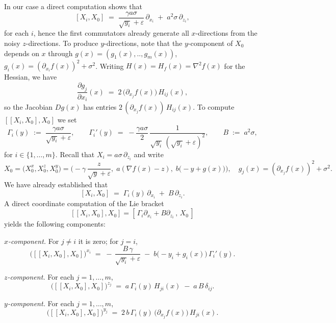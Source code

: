 \documentclass[11pt, a4paper,leqno]{amsart}
\theoremstyle{definition}
\numberwithin{equation}{section}
\begin{document}
 In our case a direct computation shows that
\[
[X_i,X_0] \;=\; \frac{\gamma a\sigma}{\sqrt{y_i}+\varepsilon}\,\partial_{x_i}
\;+\; a^2\sigma\,\partial_{z_i},
\]
for each $i$, hence the first commutators already generate all $x$-directions from the noisy $z$-directions.
To produce $y$-directions, note that the $y$-component of $X_0$ depends on $x$ through $g(x)=(g_1(x),..,g_m(x))$, $g_i(x)=(\partial_{x_i}f(x))^2+\sigma^2$.
Writing $H(x) =H_f(x)= \nabla^2 f(x)$ for the Hessian, we have
\[
\frac{\partial g_j}{\partial x_i}(x) \;=\; 2\,\bigl(\partial_{x_j} f(x)\bigr)\,H_{ij}(x),
\]
so the Jacobian $Dg(x)$ has entries $2\,(\partial_{x_j} f(x))\,H_{ij}(x)$.
To compute $[[X_i,X_0],X_0]$ we set
\[
\Gamma_i(y)\;:=\;\frac{\gamma a\sigma}{\sqrt{y_i}+\varepsilon},\qquad
\Gamma_i'(y)\;=\;-\frac{\gamma a\sigma}{2}\,\frac{1}{\sqrt{y_i}\,(\sqrt{y_i}+\varepsilon)^2},
\qquad
B\;:=\;a^2\sigma,
\]
for  $i\in\{1,\dots,m\}$. Recall that $X_i=a\sigma\,\partial_{z_i}$ and write
\[
X_0=\big(X_0^x,X_0^z,X_0^y\big)
=\Big(-\gamma\,\frac{z}{\sqrt{y}+\varepsilon},\; a(\nabla f(x)-z),\; b\big(-y+g(x)\big)\Big),
\quad g_j(x)=(\partial_{x_j}f(x))^2+\sigma^2.
\]
We have already established that
\[
[X_i,X_0]\;=\;\Gamma_i(y)\,\partial_{x_i}\;+\;B\,\partial_{z_i}.
\]
A direct coordinate computation of the Lie bracket
\[
[[X_i,X_0],X_0]=[\,\Gamma_i\partial_{x_i}+B\partial_{z_i}\,,\,X_0\,]
\]
yields the following components:

\medskip
\noindent\emph{$x$-component.} For $j\neq i$ it is zero; for $j=i$,
\[
\big([[X_i,X_0],X_0]\big)^{x_i}
\;=\; -\,\frac{B\,\gamma}{\sqrt{y_i}+\varepsilon}\;-\;b\big(-y_i+g_i(x)\big)\,\Gamma_i'(y).
\]

\noindent\emph{$z$-component.} For each $j=1,\dots,m$,
\[
\big([[X_i,X_0],X_0]\big)^{z_j}
\;=\; a\,\Gamma_i(y)\,H_{j i}(x)\;-\;a\,B\,\delta_{ij}.
\]

\noindent\emph{$y$-component.} For each $j=1,\dots,m$,
\[
\big([[X_i,X_0],X_0]\big)^{y_j}
\;=\; 2\,b\,\Gamma_i(y)\,\big(\partial_{x_j} f(x)\big)\,H_{j i}(x).
\]
\end{document}
